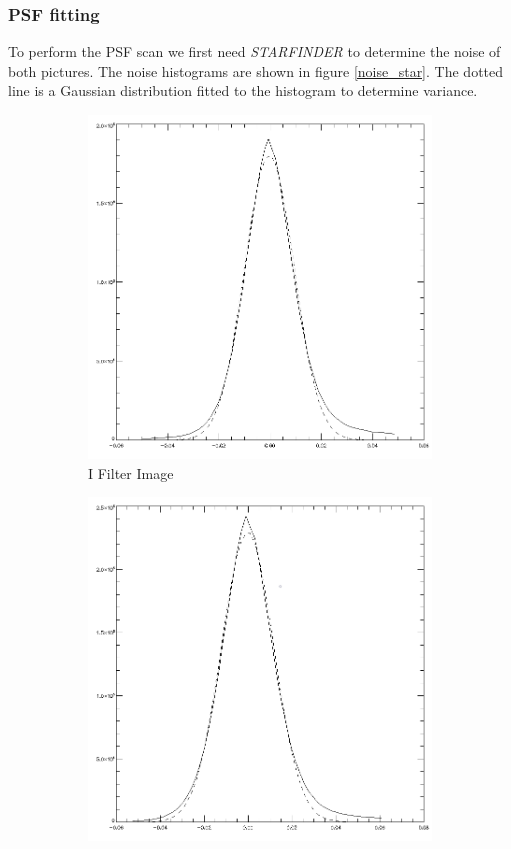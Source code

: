 \subsubsection{PSF fitting}
To perform the PSF scan we first need \textit{STARFINDER} to determine the noise of both pictures. The noise histograms are shown in figure \ref{noise_star}. The dotted line is a Gaussian distribution fitted to the histogram to determine variance.
\begin{figure}[h]
	\begin{subfigure}{0.45\textwidth}
	\centering
	\includegraphics[width=0.95\linewidth]{report_pictures/NOISE_I_Histogram}
	\caption{I Filter Image}
	\label{noise_star_I}
	\end{subfigure}
	\begin{subfigure}{0.45\textwidth}
	\centering
	\includegraphics[width=0.95\linewidth]{report_pictures/NOISE_V_Histogram}

\end{subfigure}
\end{figure}
